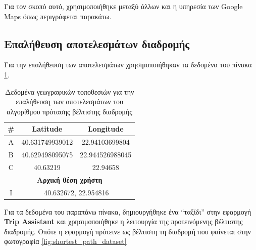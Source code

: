 \documentclass[oneside, 12pt]{book}
\begin{document}
Για τον σκοπό αυτό, χρησιμοποιήθηκε μεταξύ άλλων και η υπηρεσία των Google Maps όπως περιγράφεται παρακάτω.
\subsection{Επαλήθευση αποτελεσμάτων διαδρομής}
Για την επαλήθευση των αποτελεσμάτων χρησιμοποιήθηκαν τα δεδομένα 
του πίνακα \ref{table:shortest_places_dataset}.

\begin{table}[H]
\centering
    \begin{tabular}{|c|c|c|}
        \hline
        \textbf{\#} & \textbf{Latitude} & \textbf{Longitude} \\
        \hline
        A & 40.631749939012 & 22.94103699804 \\
        \hline
        B & 40.629498095075 & 22.944526988045 \\
        \hline
        C & 40.63219 & 22.94658 \\
        \hline
        \multicolumn{3}{|c|}{\textbf{Αρχική θέση χρήστη}} \\
        \hline
        I & \multicolumn{2}{|c|}{40.632672, 22.954816}  \\
         \hline
    \end{tabular}
    \caption{Δεδομένα γεωγραφικών τοποθεσιών για την επαλήθευση των αποτελεσμάτων του αλγορίθμου πρότασης βέλτιστης διαδρομής\label{table:shortest_places_dataset}}
\end{table}

Για τα δεδομένα του παραπάνω πίνακα, δημιουργήθηκε ένα ``ταξίδι'' 
στην εφαρμογή \textbf{Trip Assistant} και χρησιμοποιήθηκε η 
λειτουργία της προτεινόμενης βέλτιστης διαδρομής.
Οπότε η εφαρμογή πρότεινε ως βέλτιστη τη διαδρομή που φαίνεται στην 
φωτογραφία \ref{fig:shortest_path_dataset}
\end{document}
